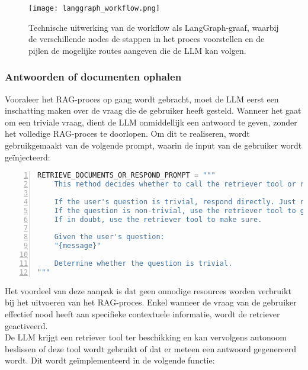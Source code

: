 \begin{figure}[H]
    \centering
    \texttt{[image: langgraph\_workflow.png]}
    \caption{Technische uitwerking van de workflow als LangGraph-graaf, waarbij de verschillende nodes de stappen in het proces voorstellen en de pijlen de mogelijke routes aangeven die de LLM kan volgen.}
    \label{fig:langgraph}
\end{figure}

\subsubsection{Antwoorden of documenten ophalen}

Vooraleer het RAG-proces op gang wordt gebracht, moet de LLM eerst een inschatting maken over de vraag die de gebruiker heeft gesteld. Wanneer het gaat om een triviale vraag, dient de LLM onmiddellijk een antwoord te geven, zonder het volledige RAG-proces te doorlopen. Om dit te realiseren, wordt gebruikgemaakt van de volgende prompt, waarin de input van de gebruiker wordt geïnjecteerd: 

\begin{lstlisting}[basicstyle=\small, frame=single, breaklines=true, postbreak=\mbox{\textcolor{red}{$\hookrightarrow$}\space}, escapeinside ={\%,}, escapechar={!}, numbers=left, language=Python, caption=Prompt voor beslissen tussen direct antwoord of documentopvraging]
RETRIEVE_DOCUMENTS_OR_RESPOND_PROMPT = """
    This method decides whether to call the retriever tool or respond directly.
    
    If the user's question is trivial, respond directly. Just respond directly. Do not show your reasoning or thinking process.
    If the question is non-trivial, use the retriever tool to generate a response.
    If in doubt, use the retriever tool to make sure.
    
    Given the user's question:  
    "{message}"
    
    Determine whether the question is trivial. 
"""
\end{lstlisting}

Het voordeel van deze aanpak is dat geen onnodige resources worden verbruikt bij het uitvoeren van het RAG-proces. Enkel wanneer de vraag van de gebruiker effectief nood heeft aan specifieke contextuele informatie, wordt de retriever geactiveerd.
\\[1em]
De LLM krijgt een retriever tool ter beschikking en kan vervolgens autonoom beslissen of deze tool wordt gebruikt of dat er meteen een antwoord gegenereerd wordt. Dit wordt geïmplementeerd in de volgende functie:

